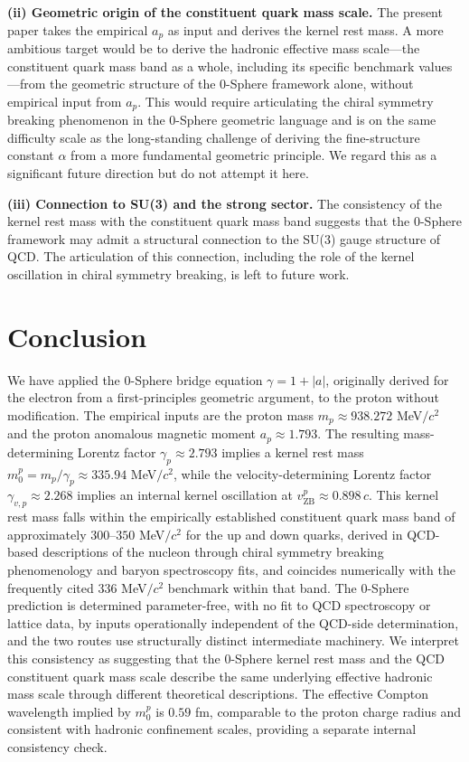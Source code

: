 \documentclass[%
 reprint, amsmath,amssymb, aps, prc, ]{revtex4-2}
\numberwithin{equation}{section}
\newcommand{\vZB}{v_{\text{ZB}}}
\begin{document}
\textbf{(ii) Geometric origin of the constituent quark mass scale.}
The present paper takes the empirical $a_p$ as input and derives the kernel rest mass.
A more ambitious target would be to derive the hadronic effective mass scale---the constituent quark mass band as a whole, including its specific benchmark values---from the geometric structure of the 0-Sphere framework alone, without empirical input from $a_p$.
This would require articulating the chiral symmetry breaking phenomenon in the 0-Sphere geometric language and is on the same difficulty scale as the long-standing challenge of deriving the fine-structure constant $\alpha$ from a more fundamental geometric principle.
We regard this as a significant future direction but do not attempt it here.

\textbf{(iii) Connection to SU(3) and the strong sector.}
The consistency of the kernel rest mass with the constituent quark mass band suggests that the 0-Sphere framework may admit a structural connection to the SU(3) gauge structure of QCD.
The articulation of this connection, including the role of the kernel oscillation in chiral symmetry breaking, is left to future work.

\section{Conclusion}
\label{sec:conclusion}

We have applied the 0-Sphere bridge equation $\gamma = 1 + |a|$, originally derived for the electron from a first-principles geometric argument, to the proton without modification.
The empirical inputs are the proton mass $m_p \approx 938.272$ MeV$/c^2$ and the proton anomalous magnetic moment $a_p \approx 1.793$.
The resulting mass-determining Lorentz factor $\gamma_p \approx 2.793$ implies a kernel rest mass $m_0^p = m_p / \gamma_p \approx 335.94$ MeV$/c^2$, while the velocity-determining Lorentz factor $\gamma_{v,p} \approx 2.268$ implies an internal kernel oscillation at $\vZB^p \approx 0.898\,c$.
This kernel rest mass falls within the empirically established constituent quark mass band of approximately $300\text{--}350$ MeV$/c^2$ for the up and down quarks, derived in QCD-based descriptions of the nucleon through chiral symmetry breaking phenomenology and baryon spectroscopy fits, and coincides numerically with the frequently cited $336$ MeV$/c^2$ benchmark within that band.
The 0-Sphere prediction is determined parameter-free, with no fit to QCD spectroscopy or lattice data, by inputs operationally independent of the QCD-side determination, and the two routes use structurally distinct intermediate machinery.
We interpret this consistency as suggesting that the 0-Sphere kernel rest mass and the QCD constituent quark mass scale describe the same underlying effective hadronic mass scale through different theoretical descriptions.
The effective Compton wavelength implied by $m_0^p$ is $0.59$ fm, comparable to the proton charge radius and consistent with hadronic confinement scales, providing a separate internal consistency check.
\end{document}
